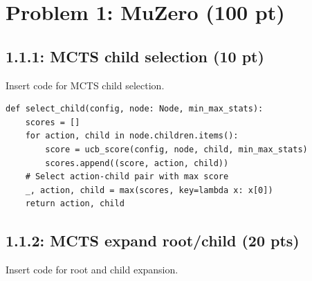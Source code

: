 \documentclass[12pt]{article}
\begin{document}


\newpage
\section*{Problem 1: MuZero (100 pt)}


\subsection*{1.1.1: MCTS child selection (10 pt)}
Insert code for MCTS child selection.

\begin{tcolorbox}[height=20cm, width=\textwidth]
    \begin{center}
        \begin{verbatim}
def select_child(config, node: Node, min_max_stats):
    scores = []
    for action, child in node.children.items():
        score = ucb_score(config, node, child, min_max_stats)
        scores.append((score, action, child))
    # Select action-child pair with max score
    _, action, child = max(scores, key=lambda x: x[0])
    return action, child
        \end{verbatim}
    \end{center}
\end{tcolorbox}
\newpage


\subsection*{1.1.2: MCTS expand root/child (20 pts)}
Insert code for root and child expansion.
\end{document}
